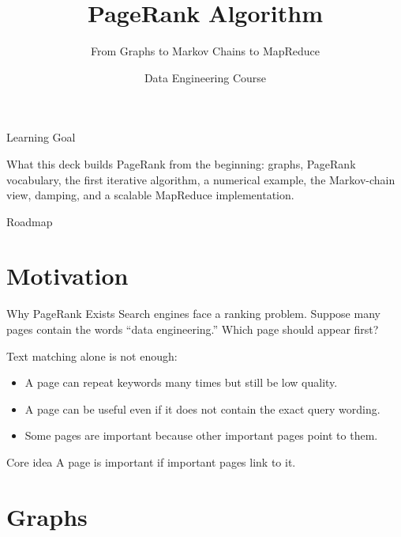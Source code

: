 \documentclass[aspectratio=169,11pt]{beamer}
\title[PageRank]{PageRank Algorithm}
\subtitle{From Graphs to Markov Chains to MapReduce}
\author{Data Engineering Course}
\date{}
\begin{document}
\begin{frame}
  \titlepage
\end{frame}

\begin{frame}{Learning Goal}
\begin{block}{What this deck builds}
PageRank from the beginning: graphs, PageRank vocabulary, the first iterative
algorithm, a numerical example, the Markov-chain view, damping, and a scalable
MapReduce implementation.
\end{block}
\end{frame}

\begin{frame}{Roadmap}
  \tableofcontents
\end{frame}

\section{Motivation}

\begin{frame}{Why PageRank Exists}
Search engines face a ranking problem. Suppose many pages contain the words
``data engineering.'' Which page should appear first?

\vspace{0.4em}
Text matching alone is not enough:
\begin{itemize}
  \item A page can repeat keywords many times but still be low quality.
  \item A page can be useful even if it does not contain the exact query wording.
  \item Some pages are important because other important pages point to them.
\end{itemize}

\begin{block}{Core idea}
A page is important if important pages link to it.
\end{block}
\end{frame}

\section{Graphs}
\end{document}
